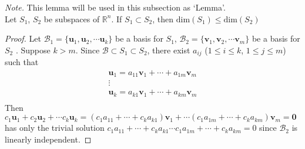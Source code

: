 \begin{plaintheorem}
	\textit{Note.} This lemma will be used in this subsection as `Lemma'. \\
	Let $ S_{1} $, $ S_{2} $ be subspaces of $ \mathbb{R}^{n} $. If $ S_{1} \subset S_{2} $, then $ \text{dim}(S_{1}) \le \text{dim}(S_{2})  $
\end{plaintheorem}
\begin{proof}
	Let $ \mathcal{B}_{1} = \{\textbf{u}_1, \textbf{u}_2, \cdots \textbf{u}_k\} $ be a basis for $ S_{1} $, $ \mathcal{B}_{2} = \{\textbf{v}_1, \textbf{v}_2, \cdots \textbf{v}_m\} $ be a basis for $ S_{2} $ . 
	Suppose $ k>m $. Since $ \mathcal{B} \subset S_{1} \subset S_{2} $, there exist $ a_{ij} $ ($ 1\leq i \leq k $, $ 1 \leq j \leq m $) such that 
	\begin{gather*}
	\textbf{u}_1 = a_{11}\textbf{v}_1+ \cdots + a_{1m}\textbf{v}_m \\
	\vdots \\
	\textbf{u}_k = a_{k1}\textbf{v}_1+ \cdots + a_{km}\textbf{v}_m \\
	\end{gather*}
	Then $ c_1\textbf{u}_1+c_2\textbf{u}_2+\cdots c_k\textbf{u}_k = \left(c_{1}a_{11}+\cdots + c_{k}a_{k1}\right)\textbf{v}_1 + \cdots \left(c_{1}a_{1m}+\cdots + c_{k}a_{km}\right)\textbf{v}_m = \textbf{0}$ has only the trivial solution $ c_{1}a_{11}+\cdots + c_{k}a_{k1} \cdots c_{1}a_{1m}+\cdots + c_{k}a_{km} = 0$ since $ \mathcal{B}_{2} $ is linearly independent.
	

\end{proof}

